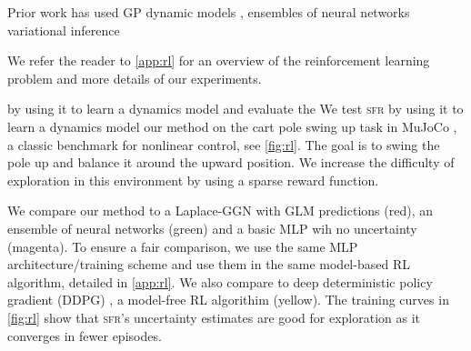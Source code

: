 \documentclass{article}
\newcommand{\our}{\textsc{sfr}\xspace}
\begin{document}
Prior work has used GP dynamic models \cite{deisenrothPILCO2011,kamtheDataEfficient2018}, ensembles of neural
networks \cite{curiEfficient2020,chuaDeepReinforcementLearning2018}
variational inference \cite{galImproving2016,houthooftVIME2017}



We refer the reader to \cref{app:rl} for an overview of the reinforcement learning problem and more details of our experiments.


by using it to learn a dynamics model and
evaluate the
We test \our by using it to learn a dynamics model
our method on the cart pole swing up task in MuJoCo \cite{todorov2012mujoco}, a classic benchmark for nonlinear control, see \cref{fig:rl}.
The goal is to swing the pole up and balance it around the upward position.
We increase the  difficulty of exploration in this environment by using a sparse reward function.


We compare our method to a Laplace-GGN with GLM predictions (red), an ensemble of neural networks (green) and a basic MLP wih no uncertainty (magenta).
To ensure a fair comparison, we use the same MLP architecture/training scheme and use them in the same model-based RL algorithm, detailed in \cref{app:rl}.
We also compare to deep deterministic policy gradient (DDPG) \cite{lillicrapContinuousControlDeep2016}, a model-free RL algorithim (yellow).
The training curves in \cref{fig:rl} show that \our's uncertainty estimates are good for exploration as it converges in fewer episodes.
\end{document}
